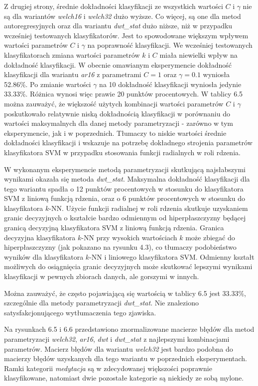 \documentclass[notitlepage]{report}
\begin{document}
Z drugiej strony, średnie dokładności klasyfikacji ze wszystkich wartości $C$ i $\gamma$ nie są dla wariantów \textit{welch16} i \textit{welch32} dużo wyższe. Co więcej, są one dla metod autoregresyjnych oraz dla wariantu \textit{dwt\_stat} dużo niższe, niż w przypadku wcześniej testowanych klasyfikatorów. Jest to spowodowane większym wpływem wartości parametrów $C$ i $\gamma$ na poprawność klasyfikacji. We wcześniej testowanych klasyfikatorach zmiana wartości parametrów $k$ i $C$ miała niewielki wpływ na dokładność klasyfikacji. W obecnie omawianym eksperymencie dokładność klasyfikacji dla wariantu \textit{ar16} z parametrami $C=1$ oraz $\gamma=
0.1$ wyniosła 52.86\%. Po zmianie wartości $\gamma$ na 10 dokładność klasyfikacji wyniosła jedynie 33.33\%. Różnica wynosi więc prawie 20 punktów procentowych. W tablicy 6.5 można zauważyć, że większość użytych kombinacji wartości parametrów $C$ i $\gamma$ poskutkowało relatywnie niską dokładnością klasyfikacji w porównaniu do wartości maksymalnych dla danej metody parametryzacji - zarówno w tym eksperymencie, jak i w poprzednich. Tłumaczy to niskie wartości średnie dokładności klasyfikacji i wskazuje na potrzebę dokładnego strojenia parametrów klasyfikatora SVM w przypadku stosowania funkcji radialnych w roli rdzenia. 

W wykonanym eksperymencie metodą parametryzacji skutkującą najsłabszymi wynikami okazała się metoda \textit{dwt\_stat}. Maksymalna dokładność klasyfikacji dla tego wariantu spadła o 12 punktów procentowych w stosunku do klasyfikatora SVM z liniową funkcją rdzenia, oraz o 6 punktów procentowych w stosunku do klasyfikatora $k$-NN. Użycie funkcji radialnej w roli rdzenia skutkuje uzyskaniem granic decyzyjnych o kształcie bardzo odmiennym od hiperpłaszczyzny będącej granicą decyzyjną klasyfikatora SVM z liniową funkcją rdzenia. Granica decyzyjna klasyfikatora $k$-NN przy wysokich wartościach $k$ może zbiegać do hiperpłaszczyzny (jak pokazano na rysunku 4.3), co tłumaczy podobieństwo wyników dla klasyfikatora $k$-NN i liniowego klasyfikatora SVM. Odmienny kształt możliwych do osiągnięcia granic decyzyjnych może skutkować lepszymi wynikami klasyfikacji w pewnych zbiorach danych, ale gorszymi w innych.

Można zauważyć, że często pojawiającą się wartością w tablicy 6.5 jest 33.33\%, szczególnie dla metody parametryzacji \textit{dwt\_stat}. Nie znaleziono satysfakcjonującego wytłumaczenia tego zjawiska.

Na rysunkach 6.5 i 6.6 przedstawiono znormalizowane macierze błędów dla metod parametryzacji \textit{welch32}, \textit{ar16}, \textit{dwt} i \textit{dwt\_stat} z najlepszymi kombinacjami parametrów. Macierz błędów dla wariantu \textit{welch32} jest bardzo podobna do macierzy błędów uzyskanych dla tego wariantu w poprzednich eksperymentach. Ramki kategorii \textit{medytacja} są w zdecydowanej większości poprawnie klasyfikowane, natomiast dwie pozostałe kategorie są niekiedy ze sobą mylone. 
\end{document}
